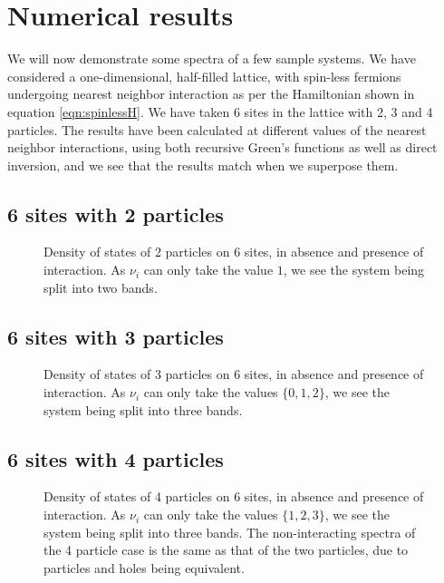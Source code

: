\chapter{\label{results}Numerical results}

\setcounter{equation}{0}
\setcounter{table}{0}
\setcounter{figure}{0}

We will now demonstrate some spectra of a few sample systems. We have considered a one-dimensional, half-filled lattice, with spin-less fermions undergoing nearest neighbor interaction as per the Hamiltonian shown in equation \eqref{eqn:spinlessH}. We have taken 6 sites in the lattice with 2, 3 and 4 particles. The results have been calculated  at different values of the nearest neighbor interactions, using both recursive Green's functions as well as direct inversion, and we see that the results match when we superpose them.

\section{6 sites with 2 particles}
\begin{figure}[h!]
	\centering
	\caption{Density of states of 2 particles on 6 sites, in absence and presence of interaction. As $ \nu_i $ can only take the value $ 1 $, we see the system being split into two bands.}
\end{figure}

\section{6 sites with 3 particles}
\begin{figure}[h!]
	\centering
	\caption{Density of states of 3 particles on 6 sites, in absence and presence of interaction. As $ \nu_i $ can only take the values $ \{ 0, 1, 2\} $, we see the system being split into three bands.}
\end{figure}

\section{6 sites with 4 particles}
\begin{figure}[h!]
	\centering
	\caption{Density of states of 4 particles on 6 sites, in absence and presence of interaction. As $ \nu_i $ can only take the values $ \{ 1, 2, 3 \} $, we see the system being split into three bands. The non-interacting spectra of the 4 particle case is the same as that of the two particles, due to particles and holes being equivalent.}
\end{figure}

